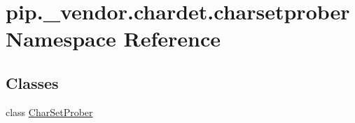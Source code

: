 \hypertarget{namespacepip_1_1__vendor_1_1chardet_1_1charsetprober}{}\section{pip.\+\_\+vendor.\+chardet.\+charsetprober Namespace Reference}
\label{namespacepip_1_1__vendor_1_1chardet_1_1charsetprober}
\subsection*{Classes}
\begin{DoxyCompactItemize}
\item 
class \hyperlink{classpip_1_1__vendor_1_1chardet_1_1charsetprober_1_1CharSetProber}{Char\+Set\+Prober}
\end{DoxyCompactItemize}
